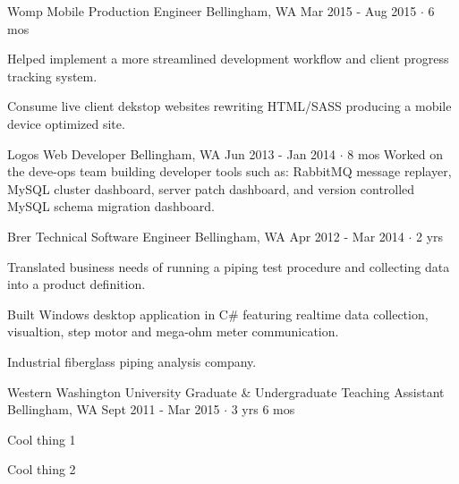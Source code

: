 \documentclass[11pt, a4paper]{awesome-cv}
\begin{document}
\begin{cventries}
  \cventry
    {Womp Mobile} %
    {Production Engineer} %
    {Bellingham, WA} %
    {Mar 2015 - Aug 2015  $\cdot$ 6 mos} %
    {
      \begin{cvitems} %
        \item Helped implement a more streamlined development workflow and client progress tracking system.
      \end{cvitems}
    }
    {Consume live client dekstop websites rewriting HTML/SASS producing a mobile device optimized site.}

  \cventry
    {Logos} %
    {Web Developer} %
    {Bellingham, WA} %
    {Jun 2013 - Jan 2014  $\cdot$ 8 mos} %
    {
    }
    {Worked on the deve-ops team building developer tools such as: RabbitMQ message replayer, MySQL cluster dashboard, server patch dashboard, and version controlled MySQL schema migration dashboard.}

  \cventry
    {Brer Technical} %
    {Software Engineer} %
    {Bellingham, WA} %
    {Apr 2012 - Mar 2014  $\cdot$ 2 yrs} %
    {
      \begin{cvitems} %
        \item Translated business needs of running a piping test procedure and collecting data into a product definition.
        \item Built Windows desktop application in C\# featuring realtime data collection, visualtion, step motor and mega-ohm meter communication.
      \end{cvitems}
    }
    {Industrial fiberglass piping analysis company.}

  \cventry
    {Western Washington University} %
    {Graduate \& Undergraduate Teaching Assistant} %
    {Bellingham, WA} %
    {Sept 2011 - Mar 2015  $\cdot$ 3 yrs 6 mos} %
    {
      \begin{cvitems} %
        \item Cool thing 1
        \item Cool thing 2
      \end{cvitems}
    }
    {}

\end{cventries}
\end{document}
